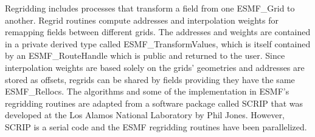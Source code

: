 


Regridding includes processes that transform a field from one ESMF\_Grid to
another.  Regrid routines compute addresses and interpolation weights for
remapping fields between different grids.  The addresses and weights
are contained in a private derived type called ESMF\_TransformValues, which is
itself contained by an ESMF\_RouteHandle which is public and returned to the
user.  Since interpolation weights are based solely on the grids' geometries
and addresses are stored as offsets, regrids can be shared by fields providing
they have the same ESMF\_Rellocs.  The algorithms and some of the
implementation in ESMF's regridding routines are adapted from a software package
called SCRIP that was developed at the Los Alamos National Laboratory by Phil
Jones.  However, SCRIP is a serial code and the ESMF regridding routines have
been parallelized.

